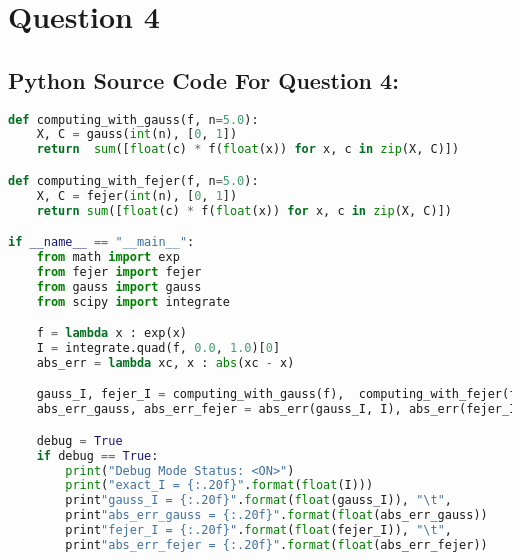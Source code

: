 \documentclass{article}
\begin{document}
\section*{Question 4}
\subsection*{Python Source Code For Question 4: }
\begin{lstlisting}[language=Python]
def computing_with_gauss(f, n=5.0):
    X, C = gauss(int(n), [0, 1])
    return  sum([float(c) * f(float(x)) for x, c in zip(X, C)])

def computing_with_fejer(f, n=5.0):
    X, C = fejer(int(n), [0, 1])
    return sum([float(c) * f(float(x)) for x, c in zip(X, C)])

if __name__ == "__main__":
    from math import exp
    from fejer import fejer
    from gauss import gauss
    from scipy import integrate

    f = lambda x : exp(x)
    I = integrate.quad(f, 0.0, 1.0)[0]
    abs_err = lambda xc, x : abs(xc - x)

    gauss_I, fejer_I = computing_with_gauss(f),  computing_with_fejer(f)
    abs_err_gauss, abs_err_fejer = abs_err(gauss_I, I), abs_err(fejer_I, I)

    debug = True
    if debug == True:
        print("Debug Mode Status: <ON>")
        print("exact_I = {:.20f}".format(float(I)))
        print"gauss_I = {:.20f}".format(float(gauss_I)), "\t",
        print"abs_err_gauss = {:.20f}".format(float(abs_err_gauss))
        print"fejer_I = {:.20f}".format(float(fejer_I)), "\t",
        print"abs_err_fejer = {:.20f}".format(float(abs_err_fejer))
\end{lstlisting}
 
\end{document}
